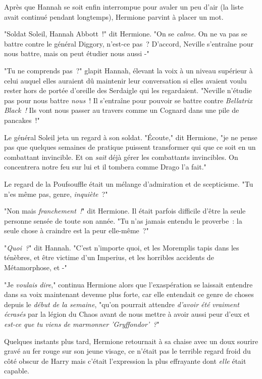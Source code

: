 Après que Hannah se soit enfin interrompue pour avaler un peu d'air (la liste avait continué pendant longtemps), Hermione parvint à placer un mot.

"Soldat Soleil, Hannah Abbott~!" dit Hermione. "On se \emph{calme}. On ne va pas se battre contre le général Diggory, n'est-ce pas~? D'accord, Neville s'entraîne pour nous battre, mais on peut étudier nous aussi -"

"Tu ne comprends pas~?" glapit Hannah, élevant la voix à un niveau supérieur à celui auquel elles auraient dû maintenir leur conversation si elles avaient voulu rester hors de portée d'oreille des Serdaigle qui les regardaient. "Neville n'étudie pas pour nous battre \emph{nous}~! Il s'entraîne pour pouvoir se battre contre \emph{Bellatrix Black~!} Ils vont nous passer au travers comme un Cognard dans une pile de pancakes~!"

Le général Soleil jeta un regard à son soldat. "Écoute," dit Hermione, "je ne pense pas que quelques semaines de pratique puissent transformer qui que ce soit en un combattant invincible. Et on \emph{sait} déjà gérer les combattants invincibles. On concentrera notre feu sur lui et il tombera comme Drago l'a fait."

Le regard de la Poufsouffle était un mélange d'admiration et de scepticisme. "Tu n'es même pas, genre, \emph{inquiète}~?"

"Non mais \emph{franchement~!}" dit Hermione. Il était parfois difficile d'être la seule personne sensée de toute son année. "Tu n'as jamais entendu le proverbe~: la seule chose à craindre est la peur elle-même~?"

"\emph{Quoi~?}" dit Hannah. "C'est n'importe quoi, et les Moremplis tapis dans les ténèbres, et être victime d'un Imperius, et les horribles accidents de Métamorphose, et -"

"Je \emph{voulais dire}," continua Hermione alors que l'exaspération se laissait entendre dans sa voix maintenant devenue plus forte, car elle entendait ce genre de choses depuis le \emph{début de la semaine}, "qu'on pourrait attendre \emph{d'avoir été} \emph{vraiment} \emph{écrasés} par la légion du Chaos avant de nous mettre à avoir aussi peur d'eux et \emph{est-ce que tu viens de marmonner 'Gryffondor'~?}"

Quelques instants plus tard, Hermione retournait à sa chaise avec un doux sourire gravé au fer rouge sur son jeune visage, ce n'était pas le terrible regard froid du côté obscur de Harry mais c'était l'expression la plus effrayante dont \emph{elle} était capable.

